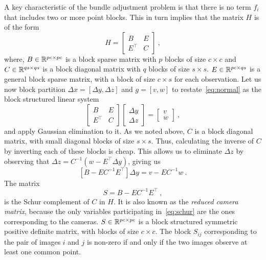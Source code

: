A key characteristic of the bundle adjustment problem is that there is no term $f_{i}$ that includes two or more point blocks.  This in turn implies that the matrix $H$ is of the form
\begin{equation}
        H =  \left[
                \begin{matrix} B & E\\ E^\top & C
                \end{matrix}
                \right]\ ,
\label{eq:hblock}
\end{equation}
where, $B \in \mathbb{R}^{pc\times pc}$ is a block sparse matrix with $p$ blocks of size $c\times c$ and  $C \in \mathbb{R}^{qs\times qs}$ is a block diagonal matrix with $q$ blocks of size $s\times s$. $E \in \mathbb{R}^{pc\times qs}$ is a general block sparse matrix, with a block of size $c\times s$ for each observation. Let us now block partition $\Delta x = [\Delta y,\Delta z]$ and $g=[v,w]$ to restate~\eqref{eq:normal} as the block structured linear system
\begin{equation}
        \left[
                \begin{matrix} B & E\\ E^\top & C
                \end{matrix}
                \right]\left[
                        \begin{matrix} \Delta y \\ \Delta z
                        \end{matrix}
                        \right]
                        =
                        \left[
                                \begin{matrix} v\\ w
                                \end{matrix}
                                \right]\ ,
\label{eq:linear2}
\end{equation}
and apply Gaussian elimination to it. As we noted above, $C$ is a block diagonal matrix, with small diagonal blocks of size $s\times s$.
Thus, calculating the inverse of $C$ by inverting each of these blocks is  cheap. This allows us to  eliminate $\Delta z$ by observing that $\Delta z = C^{-1}(w - E^\top \Delta y)$, giving us
\begin{equation}
        \left[B - EC^{-1}E^\top\right] \Delta y = v - EC^{-1}w\ .  \label{eq:schur}
\end{equation}
The matrix
\begin{equation}
S = B - EC^{-1}E^\top\ ,
\end{equation}
is the Schur complement of $C$ in $H$. It is also known as the {\em reduced camera matrix}, because the only variables participating in~\eqref{eq:schur} are the ones corresponding to the cameras. $S \in \mathbb{R}^{pc\times pc}$ is a block structured symmetric positive definite matrix, with blocks of size $c\times c$. The block $S_{ij}$ corresponding to the pair of images $i$ and $j$ is non-zero if and only if the two images observe at least one common point.

